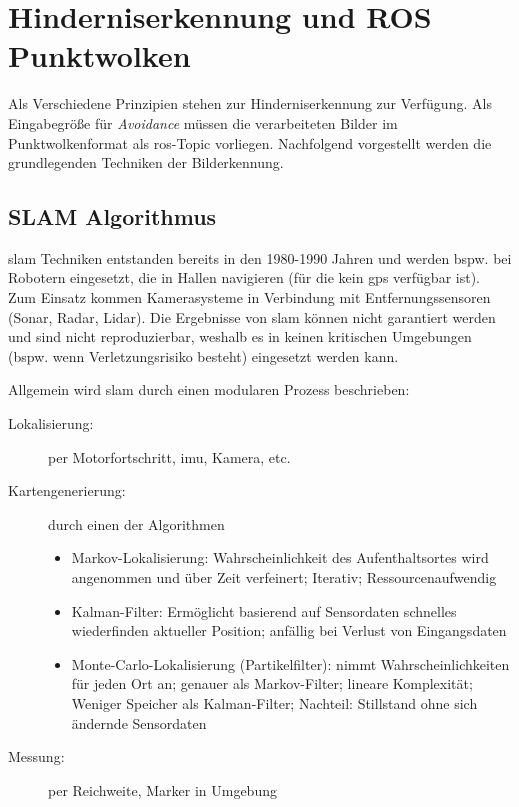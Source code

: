 
\section{Hinderniserkennung und ROS Punktwolken}\label{chap:intro_pointcloud}
Als Verschiedene Prinzipien stehen zur Hinderniserkennung zur Verfügung. Als Eingabegröße für \textit{Avoidance} müssen die verarbeiteten Bilder im Punktwolkenformat als \acrshort{ros}-Topic vorliegen.
Nachfolgend vorgestellt werden die grundlegenden Techniken der Bilderkennung. 
\subsection{SLAM Algorithmus}\label{chap:slam}
\Gls{slam} Techniken entstanden bereits in den 1980-1990 Jahren und werden bspw. bei Robotern eingesetzt, die in Hallen navigieren (für die kein \acrshort{gps} verfügbar ist). Zum Einsatz kommen Kamerasysteme in Verbindung mit Entfernungssensoren (Sonar, Radar, Lidar). Die Ergebnisse von \gls{slam} können nicht garantiert werden und sind nicht reproduzierbar, weshalb es in keinen kritischen Umgebungen (bspw. wenn Verletzungsrisiko besteht) eingesetzt werden kann.

Allgemein wird \gls{slam} durch einen modularen Prozess beschrieben:
\begin{description}
    \item[Lokalisierung:] per Motorfortschritt, \gls{imu}, Kamera, etc.%
    \item[Kartengenerierung:] durch einen der Algorithmen
\begin{itemize}
    \item Markov-Lokalisierung: Wahrscheinlichkeit des Aufenthaltsortes wird angenommen und über Zeit verfeinert; Iterativ; Ressourcenaufwendig
	\item Kalman-Filter: Ermöglicht basierend auf Sensordaten schnelles wiederfinden aktueller Position; anfällig bei Verlust von Eingangsdaten
	\item Monte-Carlo-Lokalisierung (Partikelfilter): nimmt Wahrscheinlichkeiten für jeden Ort an; genauer als Markov-Filter; lineare Komplexität; Weniger Speicher als Kalman-Filter; Nachteil: Stillstand ohne sich ändernde Sensordaten
\end{itemize}
    \item[Messung:] per Reichweite, Marker in Umgebung
\end{description}


